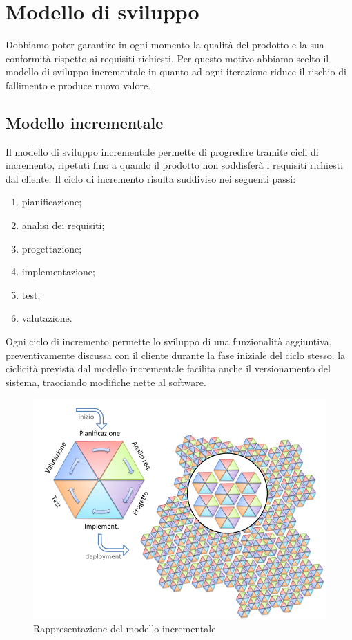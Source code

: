\section{Modello di sviluppo}

Dobbiamo poter garantire in ogni momento la qualità del prodotto e la sua conformità rispetto ai requisiti richiesti.
Per questo motivo abbiamo scelto il modello di sviluppo incrementale in quanto ad ogni iterazione 
riduce il rischio di fallimento e produce nuovo valore.

\subsection*{Modello incrementale}

Il modello di sviluppo incrementale permette di progredire tramite cicli di incremento, 
ripetuti fino a quando il prodotto non soddisferà i requisiti richiesti dal cliente.
Il ciclo di incremento risulta suddiviso nei seguenti passi:
\begin{enumerate}
    \item pianificazione;
    \item analisi dei requisiti;
    \item progettazione;
    \item implementazione;
    \item test;
    \item valutazione.
\end{enumerate}
Ogni ciclo di incremento permette lo sviluppo di una funzionalità aggiuntiva,
preventivamente discussa con il cliente durante la fase iniziale del ciclo stesso.
la ciclicità prevista dal modello incrementale facilita anche il versionamento del sistema,
tracciando modifiche nette al software.

\begin{figure}[H]
    \centering
    \includegraphics[scale = 0.5]{components/img/incrementale.png}
    \caption{Rappresentazione del modello incrementale}
    \label{fig:logo}
\end{figure}

